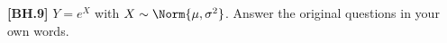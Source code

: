 \begin{exercise}
	\textbf{[BH.9]} $Y=e^X$ with $X \sim \Norm{\mu, \sigma^2}$. Answer the original questions in your own words.
\end{exercise}